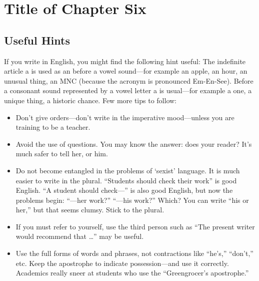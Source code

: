 \chapter{Title of Chapter Six}
\label{chap:six}
\section{Useful Hints}

If you write in English, you might find the following hint
useful: The indefinite article a is used as an before a
vowel sound---for example an apple, an hour, an unusual
thing, an \ac{MNC} (because the acronym is pronounced Em-En-See). Before a consonant sound represented
by a vowel letter a is usual---for example a one, a
unique thing, a historic chance. Few more tips to follow:


\begin{itemize}
\item Don't give orders---don't write in the imperative mood---unless you are training to be a teacher.
\item Avoid the use of questions. You may know the answer: does your reader? It's much safer to tell her, or him.
\item Do not become entangled in the problems of `sexist' language. It is much easier to write in the plural. ``Students should check their work'' is good English. ``A student should check---'' is also good English, but now the problems begin: ``---her work?'' ``---his work?'' Which? You can write ``his or her,'' but that seems clumsy. Stick to the plural.
\item If you must refer to yourself, use the third person such as ``The present writer would recommend that \ldots'' may be useful.
\item Use the full forms of words and phrases, not contractions like ``he's,'' ``don't,'' etc. Keep the apostrophe to indicate possession---and use it correctly. Academics really sneer at students who use the ``Greengrocer's apostrophe.''
\end{itemize}



